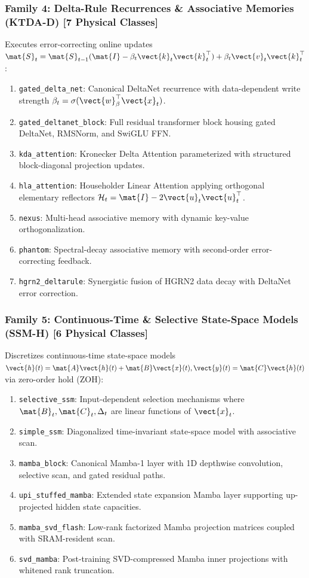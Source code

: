 \subsubsection{Family 4: Delta-Rule Recurrences \& Associative Memories (KTDA-D) [7 Physical Classes]}
Executes error-correcting online updates $\mat{S}_t = \mat{S}_{t-1}(\mat{I} - \beta_t \vect{k}_t \vect{k}_t^\top) + \beta_t \vect{v}_t \vect{k}_t^\top$:
\begin{enumerate}
    \item \texttt{gated\_delta\_net}: Canonical DeltaNet recurrence with data-dependent write strength $\beta_t = \sigma(\vect{w}_\beta^\top \vect{x}_t)$.
    \item \texttt{gated\_deltanet\_block}: Full residual transformer block housing gated DeltaNet, RMSNorm, and SwiGLU FFN.
    \item \texttt{kda\_attention}: Kronecker Delta Attention parameterized with structured block-diagonal projection updates.
    \item \texttt{hla\_attention}: Householder Linear Attention applying orthogonal elementary reflectors $\mathcal{H}_t = \mat{I} - 2\vect{u}_t \vect{u}_t^\top$.
    \item \texttt{nexus}: Multi-head associative memory with dynamic key-value orthogonalization.
    \item \texttt{phantom}: Spectral-decay associative memory with second-order error-correcting feedback.
    \item \texttt{hgrn2\_deltarule}: Synergistic fusion of HGRN2 data decay with DeltaNet error correction.
\end{enumerate}

\subsubsection{Family 5: Continuous-Time \& Selective State-Space Models (SSM-H) [6 Physical Classes]}
Discretizes continuous-time state-space models $\dot{\vect{h}}(t) = \mat{A}\vect{h}(t) + \mat{B}\vect{x}(t), \vect{y}(t) = \mat{C}\vect{h}(t)$ via zero-order hold (ZOH):
\begin{enumerate}
    \item \texttt{selective\_ssm}: Input-dependent selection mechanisms where $\mat{B}_t, \mat{C}_t, \Delta_t$ are linear functions of $\vect{x}_t$.
    \item \texttt{simple\_ssm}: Diagonalized time-invariant state-space model with associative scan.
    \item \texttt{mamba\_block}: Canonical Mamba-1 layer with 1D depthwise convolution, selective scan, and gated residual paths.
    \item \texttt{upi\_stuffed\_mamba}: Extended state expansion Mamba layer supporting up-projected hidden state capacities.
    \item \texttt{mamba\_svd\_flash}: Low-rank factorized Mamba projection matrices coupled with SRAM-resident scan.
    \item \texttt{svd\_mamba}: Post-training SVD-compressed Mamba inner projections with whitened rank truncation.
\end{enumerate}

